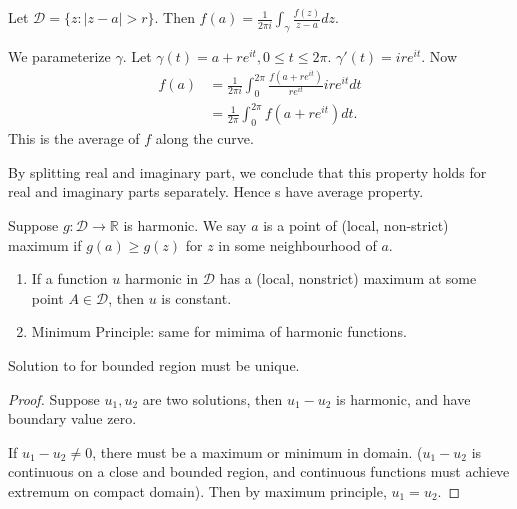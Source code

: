 \begin{property}
	
Let $\mathcal{D} = \{z: |z - a| > r\}$. Then $f(a) = \frac{1}{2 \pi i}\int _\gamma \frac{f(z)}{z - a} dz$.

We parameterize $\gamma$. Let $\gamma(t) = a + r e^{i t}, 0\le t\le 2 \pi$. $\gamma'(t) = i r e^{it}$. Now
\begin{align*}
	f(a) &= \frac{1}{2 \pi i}\int _0^{2 \pi}\frac{f(a + r e ^{it })}{r e^{it }} i r e^{it } dt\\
	     &= \frac{1}{2 \pi} \int _0^{2 \pi} f(a + r e^{it }) dt
.\end{align*}
This is the average of $f$ along the curve.

By splitting real and imaginary part, we conclude that this property holds for real and imaginary parts separately. Hence s have average property.
\end{property}

Suppose $g: \mathcal{D} \to \mathbb{R}$ is harmonic. We say $a$ is a point of (local, non-strict) maximum if $g(a) \ge g(z)$ for $z$ in some neighbourhood  of $a$.

\begin{theorem}
	\begin{enumerate}
		\item If a function $u$ harmonic in $\mathcal{D}$ has a (local, nonstrict) maximum at some point $A \in \mathcal{D}$, then $u$ is constant.
		\item Minimum Principle: same for mimima of harmonic functions.
	\end{enumerate}
\end{theorem}

\begin{corollary}
Solution to  for bounded region must be unique.
\end{corollary}
\begin{proof}
	Suppose $u_1, u_2$ are two solutions, then $u_1-u_2$ is harmonic, and have boundary value zero. 

	If $u_1-u_2 \neq 0$, there must be a maximum or minimum in domain. ($u_1-u_2$ is continuous on a close and bounded region, and continuous functions must achieve extremum on compact domain). Then by maximum principle, $u_1 = u_2$.
\end{proof}

